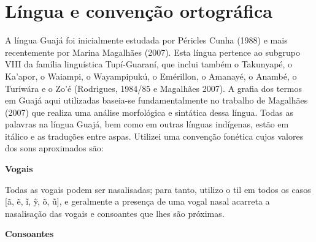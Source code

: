 
\chapter{Língua e convenção
ortográfica}\label{luxedngua-e-convenuxe7uxe3o-ortogruxe1fica}

A língua Guajá foi inicialmente estudada por Péricles Cunha (1988) e
mais recentemente por Marina Magalhães (2007). Esta língua pertence ao
subgrupo VIII da família linguística Tupí-Guaraní, que inclui também o
Takunyapé, o Ka'apor, o Waiampi, o Wayampipukú, o Emérillon, o Amanayé,
o Anambé, o Turiwára e o Zo'é (Rodrigues, 1984/85 e Magalhães 2007). A
grafia dos termos em Guajá aqui utilizadas baseia-se fundamentalmente no
trabalho de Magalhães (2007) que realiza uma análise morfológica e
sintática dessa língua. Todas as palavras na língua Guajá, bem como em
outras línguas indígenas, estão em itálico e as traduções entre aspas.
Utilizei uma convenção fonética cujos valores dos sons aproximados são:

\textbf{Vogais}


Todas as vogais podem ser nasalisadas; para tanto, utilizo o til em
todos os casos {[}ã, ẽ, ĩ, ỹ, õ, ũ{]}, e geralmente a presença de uma
vogal nasal acarreta a nasalisação das vogais e consoantes que lhes são
próximas.

\textbf{Consoantes}

